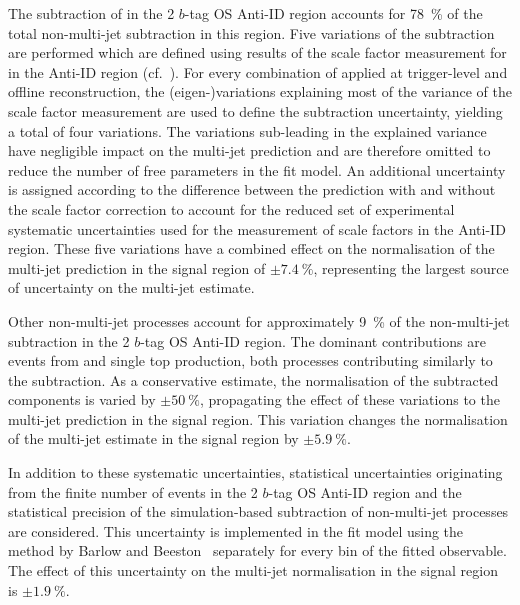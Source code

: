 The subtraction of \ttbarFakes in the 2 $b$-tag OS Anti-ID region accounts for
\SI{78}{\percent} of the total non-multi-jet subtraction in this region. Five
variations of the subtraction are performed which are defined using results of
the scale factor measurement for \ttbarFakes in the Anti-ID region (cf.\
). %
For every combination of \tauid applied at trigger-level and offline \tauhadvis
reconstruction, the (eigen-)variations explaining most of the variance of the
scale factor measurement are used to define the \ttbarFakes subtraction
uncertainty, yielding a total of four variations. The variations sub-leading in
the explained variance have negligible impact on the multi-jet prediction and
are therefore omitted to reduce the number of free parameters in the fit
model. An additional uncertainty is assigned according to the difference between
the \ttbarFakes prediction with and without the scale factor correction to
account for the reduced set of experimental systematic uncertainties used for
the measurement of \ttbarFakes scale factors in the Anti-ID region. These five
variations have a combined effect on the normalisation of the multi-jet
prediction in the signal region of $\pm\SI{7.4}{\percent}$, representing the
largest source of uncertainty on the multi-jet estimate.

Other non-multi-jet processes account for approximately \SI{9}{\percent} of the
non-multi-jet subtraction in the 2 $b$-tag OS Anti-ID region. The dominant
contributions are events from \Vjets and single top production, both processes
contributing similarly to the subtraction. As a conservative estimate, the
normalisation of the subtracted components is varied by $\pm \SI{50}{\percent}$,
propagating the effect of these variations to the multi-jet prediction in the
signal region. This variation changes the normalisation of the multi-jet
estimate in the signal region by $\pm\SI{5.9}{\percent}$.

In addition to these systematic uncertainties, statistical uncertainties
originating from the finite number of events in the 2 $b$-tag OS Anti-ID region
and the statistical precision of the simulation-based subtraction of
non-multi-jet processes are considered. This uncertainty is implemented in the
fit model using the method by Barlow and Beeston~\cite{barlow1993,conway2011}
separately for every bin of the fitted observable. The effect of this
uncertainty on the multi-jet normalisation in the signal region is
$\pm \SI{1.9}{\percent}$.

